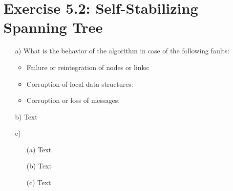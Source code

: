 \documentclass[12pt,a4paper]{article}
\begin{document}
\section*{Exercise 5.2: Self-Stabilizing Spanning Tree}
\begin{enumerate}

\item[a)] What is the behavior of the algorithm in case of the following faults:
  \begin{itemize}
  \item Failure or reintegration of nodes or links:
  \item Corruption of local data structures:
  \item Corruption or loss of messages:
  \end{itemize}
\item[b)] Text
\item[c)]
  \begin{enumerate}
  \item[(a)] Text
  \item[(b)] Text
  \item[(c)] Text
  \end{enumerate}
\end{enumerate}
\end{document}

